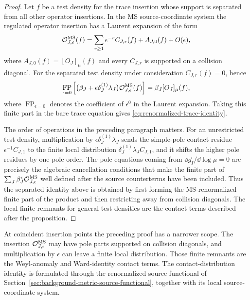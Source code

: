 \begin{proof}
Let \(f\) be a test density for the trace insertion whose support is separated
from all other operator insertions.  In the MS source-coordinate system the regulated
operator insertion has a Laurent expansion of the form
\[
  \mathcal O^{\rm MS}_{J,\epsilon}(f)
  =
  \sum_{r\ge1}\epsilon^{-r}C_{J,r}(f)
  +
  A_{J,0}(f)
  +
  O(\epsilon),
\]
where \(A_{J,0}(f)=[O_J]_\mu(f)\) and every \(C_{J,r}\) is supported on a
collision diagonal.  For the separated test density under consideration
\(C_{J,r}(f)=0\), hence
\[
  \operatorname*{FP}_{\epsilon=0}
  \left[
    \bigl(\beta_J+\epsilon\delta_J^{(1)}\lambda_J\bigr)
    \mathcal O^{\rm MS}_{J,\epsilon}(f)
  \right]
  =
  \beta_J[O_J]_\mu(f),
\]
where \(\operatorname*{FP}_{\epsilon=0}\) denotes the coefficient of
\(\epsilon^0\) in the Laurent expansion.  Taking this finite part in the bare
trace equation gives \eqref{eq:renormalized-trace-identity}.

The order of operations in the preceding paragraph matters.  For an unrestricted
test density, multiplication by
\(\epsilon\delta_J^{(1)}\lambda_J\) sends the simple-pole contact residue
\(\epsilon^{-1}C_{J,1}\) to the finite local distribution
\(\delta_J^{(1)}\lambda_J C_{J,1}\), and it shifts the higher pole residues by
one pole order.  The pole equations coming from
\(\dd g_I^\epsilon/\dd\log\mu=0\) are precisely the algebraic cancellation
conditions that make the finite part of
\(\sum_J\beta_J^\epsilon\mathcal O^{\rm MS}_{J,\epsilon}\) well defined after
the source counterterms have been included.  Thus the separated identity above
is obtained by first forming the MS-renormalized finite part of the product and
then restricting away from collision diagonals.  The local finite remnants for
general test densities are the contact terms described after the proposition.
\end{proof}

At coincident insertion points the preceding proof has a narrower scope.  The
insertion \(\mathcal O^{\rm MS}_{J,\epsilon}\) may have pole parts supported on
collision diagonals, and multiplication by \(\epsilon\) can leave a finite local
distribution.  Those finite remnants are the Weyl-anomaly and Ward-identity
contact terms.  The contact-distribution identity is formulated through the
renormalized source functional of
Section~\ref{sec:background-metric-source-functional}, together with its local
source-coordinate system.

